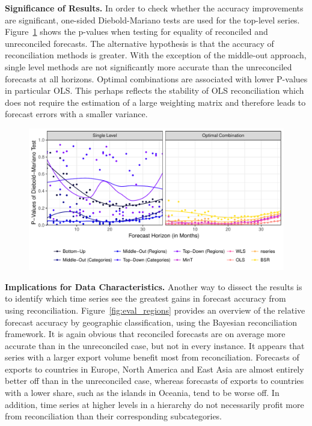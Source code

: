 \documentclass[a4paper,fleqn,11pt]{article}
\begin{document}
\noindent\textbf{Significance of Results.} In order to check whether the accuracy improvements are significant, one-sided Diebold-Mariano tests are used for the top-level series. Figure~\ref{fig:dmtest} shows the p-values when testing for equality of reconciled and unreconciled forecasts. The alternative hypothesis is that the accuracy of reconciliation methods is greater. With the exception of the middle-out approach, single level methods are not significantly more accurate than the unreconciled forecasts at all horizons. Optimal combinations are associated with lower P-values in particular OLS. This perhaps reflects the stability of OLS reconciliation which does not require the estimation of a large weighting matrix and therefore leads to forecast errors with a smaller variance.

\begin{figure}[H]
	\includegraphics[width=\textwidth]{fig/fig_dm}
	\label{fig:dmtest}
\end{figure}

\noindent\textbf{Implications for Data Characteristics.} Another way to dissect the results is to identify which time series see the greatest gains in forecast accuracy from using reconciliation. Figure~\ref{fig:eval_regions} provides an overview of the relative forecast accuracy by geographic classification, using the Bayesian reconciliation framework. It is again obvious that reconciled forecasts are on average more accurate than in the unreconciled case, but not in every instance. It appears that series with a larger export volume benefit most from reconciliation. Forecasts of exports to countries in Europe, North America and East Asia are almost entirely better off than in the unreconciled case, whereas forecasts of exports to countries with a lower share, such as the islands in Oceania, tend to be worse off. In addition, time series at higher levels in a hierarchy do not necessarily profit more from reconciliation than their corresponding subcategories.
\end{document}
